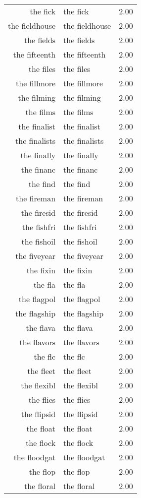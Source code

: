 \begin{table}[ht]
\begin{tabular}{rlr}
  the fick & the fick & 2.00 \\ 
  the fieldhouse & the fieldhouse & 2.00 \\ 
  the fields & the fields & 2.00 \\ 
  the fifteenth & the fifteenth & 2.00 \\ 
  the files & the files & 2.00 \\ 
  the fillmore & the fillmore & 2.00 \\ 
  the filming & the filming & 2.00 \\ 
  the films & the films & 2.00 \\ 
  the finalist & the finalist & 2.00 \\ 
  the finalists & the finalists & 2.00 \\ 
  the finally & the finally & 2.00 \\ 
  the financ & the financ & 2.00 \\ 
  the find & the find & 2.00 \\ 
  the fireman & the fireman & 2.00 \\ 
  the firesid & the firesid & 2.00 \\ 
  the fishfri & the fishfri & 2.00 \\ 
  the fishoil & the fishoil & 2.00 \\ 
  the fiveyear & the fiveyear & 2.00 \\ 
  the fixin & the fixin & 2.00 \\ 
  the fla & the fla & 2.00 \\ 
  the flagpol & the flagpol & 2.00 \\ 
  the flagship & the flagship & 2.00 \\ 
  the flava & the flava & 2.00 \\ 
  the flavors & the flavors & 2.00 \\ 
  the flc & the flc & 2.00 \\ 
  the fleet & the fleet & 2.00 \\ 
  the flexibl & the flexibl & 2.00 \\ 
  the flies & the flies & 2.00 \\ 
  the flipsid & the flipsid & 2.00 \\ 
  the float & the float & 2.00 \\ 
  the flock & the flock & 2.00 \\ 
  the floodgat & the floodgat & 2.00 \\ 
  the flop & the flop & 2.00 \\ 
  the floral & the floral & 2.00 \\ 

\end{tabular}
\end{table}
